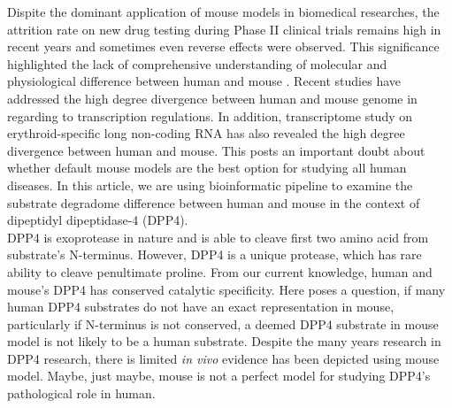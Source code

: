 Dispite the dominant application of mouse models in biomedical researches, the attrition rate on new drug testing during Phase II clinical trials remains high in recent years \cite{Arrowsmith_2011} and sometimes even reverse effects were observed. This significance highlighted the lack of comprehensive understanding of molecular and physiological difference between human and mouse \cite{de_Magalh_es_2014}. Recent studies have addressed the high degree divergence between human and mouse genome in regarding to transcription regulations. \cite{25409824} In addition, transcriptome study on erythroid-specific long non-coding RNA has also revealed the high degree divergence between human and mouse. \cite{An_2015} This posts an important doubt about whether default mouse models are the best option for studying all human diseases. In this article, we are using bioinformatic pipeline to examine the substrate degradome difference between human and mouse in the context of dipeptidyl dipeptidase-4 (DPP4).  \\

DPP4 is exoprotease in nature and is able to cleave first two amino acid from substrate's N-terminus. However, DPP4 is a unique protease, which has rare ability to cleave penultimate proline. From our current knowledge, human and mouse's DPP4 has conserved catalytic specificity. Here poses a question, if many human DPP4 substrates do not have an exact representation in mouse, particularly if N-terminus is not conserved, a deemed DPP4 substrate in mouse model is not likely to be a human substrate. Despite the many years research in DPP4 research, there is limited \textit{in vivo} evidence has been depicted using mouse model. Maybe, just maybe, mouse is not a perfect model for studying DPP4's pathological role in human. 

\cite{Justice_2011}